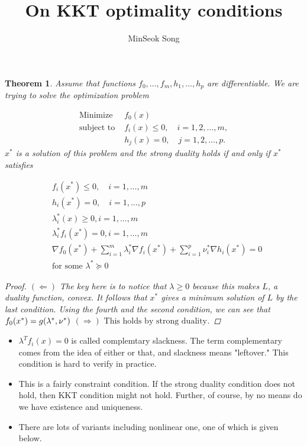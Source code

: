 \documentclass{article}
\title{On KKT optimality conditions}
\author{MinSeok Song}
\date{}
\newtheorem{theorem}{Theorem}
\theoremstyle{remark}
\begin{document}
\maketitle

\begin{theorem}
Assume that functions $f_0,\dots,f_m,h_1,\dots,h_p$ are differentiable. We
 are trying to solve the optimization problem

\begin{align*}
        \text{Minimize } & f_0(x) \\
        \text{subject to } & f_i(x) \leq 0, \quad i = 1, 2, \ldots, m, \\
        & h_j(x) = 0, \quad j = 1, 2, \ldots, p.
        \end{align*}
$x^*$ is a solution of this problem and the strong duality holds if and only if $x^*$ satisfies

\begin{align*}
        & f_i (x^*)\leq 0,\quad i=1,\dots,m\\
        & h_i(x^*)=0,\quad i=1,\dots ,p\\
        & \lambda_i^*(x)\geq 0,i=1,\dots,m\\
        &\lambda_i^* f_i(x^*)=0,i=1,\dots,m\\
        &\nabla f_0(x^*)+\sum^m_{i=1}\lambda_i^*\nabla f_i(x^*)+\sum^p_{i=1}\nu_i^* \nabla h_i(x^*)=0\\
        & \text{for some } \lambda^*\succeq 0
\end{align*}

\begin{proof}
        $(\Leftarrow)$ The key here is to notice that 
        $\lambda \geq 0$ because this makes $L$, a duality function, convex.
        It follows that $x^*$ gives a minimum solution of $L$ by the last condition.
        Using the fourth and the second condition, we can see that 
        $f_0(x^*)=g(\lambda^*,\nu^*)\\\\$
        $(\Rightarrow) \text{ This holds by strong duality}$. 
        \end{proof}
\end{theorem}
\begin{itemize}
\item $\lambda^T f_i(x)=0$ is called complemtary slackness. The term complementary
 comes from the idea of either or that, and slackness means "leftover." This condition is
  hard to verify in practice.
\item This is a fairly constraint condition. If the strong duality condition does not hold, then
KKT condition might not hold. Further, of course, by no means do we have existence and uniqueness.
\item There are lots of variants including nonlinear one, one of which is
 given below.
\end{itemize}
\end{document}
